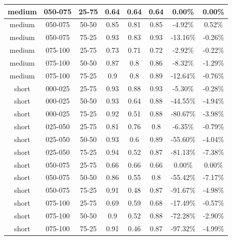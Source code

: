 \begin{table}
\begin{center}
\begin{tabular}{|c|c|c|c|c|c|c|c|}
\\\hline
medium & 050-075 & 25-75 & 0.64 & 0.64 & 0.64 & 0.00\% & 0.00\%
\\\hline
medium & 050-075 & 50-50 & 0.85 & 0.81 & 0.85 & -4.92\% & 0.52\%
\\\hline
medium & 050-075 & 75-25 & 0.93 & 0.83 & 0.93 & -13.16\% & -0.26\%
\\\hline
medium & 075-100 & 25-75 & 0.73 & 0.71 & 0.72 & -2.92\% & -0.22\%
\\\hline
medium & 075-100 & 50-50 & 0.87 & 0.8 & 0.86 & -8.32\% & -1.29\%
\\\hline
medium & 075-100 & 75-25 & 0.9 & 0.8 & 0.89 & -12.64\% & -0.76\%
\\\hline
short & 000-025 & 25-75 & 0.93 & 0.88 & 0.93 & -5.30\% & -0.28\%
\\\hline
short & 000-025 & 50-50 & 0.93 & 0.64 & 0.88 & -44.55\% & -4.94\%
\\\hline
short & 000-025 & 75-25 & 0.92 & 0.51 & 0.88 & -80.67\% & -3.98\%
\\\hline
short & 025-050 & 25-75 & 0.81 & 0.76 & 0.8 & -6.35\% & -0.79\%
\\\hline
short & 025-050 & 50-50 & 0.93 & 0.6 & 0.89 & -55.60\% & -4.04\%
\\\hline
short & 025-050 & 75-25 & 0.94 & 0.52 & 0.87 & -81.13\% & -7.38\%
\\\hline
short & 050-075 & 25-75 & 0.66 & 0.66 & 0.66 & 0.00\% & 0.00\%
\\\hline
short & 050-075 & 50-50 & 0.86 & 0.55 & 0.8 & -55.42\% & -7.17\%
\\\hline
short & 050-075 & 75-25 & 0.91 & 0.48 & 0.87 & -91.67\% & -4.98\%
\\\hline
short & 075-100 & 25-75 & 0.69 & 0.59 & 0.68 & -17.49\% & -0.57\%
\\\hline
short & 075-100 & 50-50 & 0.9 & 0.52 & 0.88 & -72.28\% & -2.90\%
\\\hline
short & 075-100 & 75-25 & 0.91 & 0.46 & 0.87 & -97.32\% & -4.99\%
\\\hline
\end{tabular}
\label{tab:predeployVSfetchUtil}
\end{center}
\end{table}



